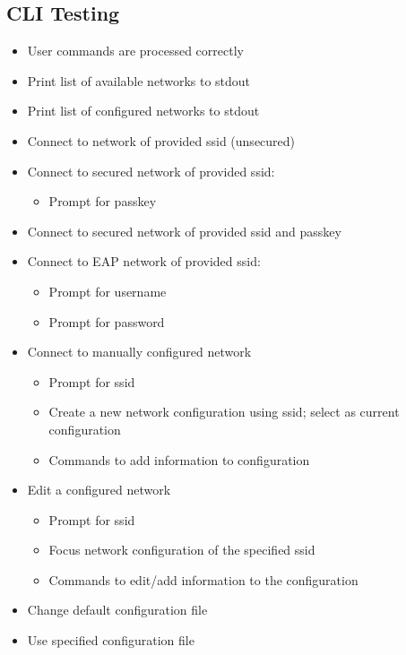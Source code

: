 \documentclass[11pt]{article}
\begin{document}
\subsection*{CLI Testing}
\begin{itemize}
  \item User commands are processed correctly
  \item Print list of available networks to stdout
  \item Print list of configured networks to stdout
  \item Connect to network of provided ssid (unsecured)
  \item Connect to secured network of provided ssid:
    \begin{itemize}
      \item Prompt for passkey
    \end{itemize}

  \item Connect to secured network of provided ssid and passkey
  \item Connect to EAP network of provided ssid:
    \begin{itemize}
      \item Prompt for username
      \item Prompt for password
    \end{itemize}

  \item Connect to manually configured network
    \begin{itemize}
      \item Prompt for ssid
      \item Create a new network configuration using ssid; select as current configuration
      \item Commands to add information to configuration
    \end{itemize}

  \item Edit a configured network
    \begin{itemize}
      \item Prompt for ssid
      \item Focus network configuration of the specified ssid
      \item Commands to edit/add information to the configuration
    \end{itemize}
  \item Change default configuration file
  \item Use specified configuration file
\end{itemize}
\end{document}
